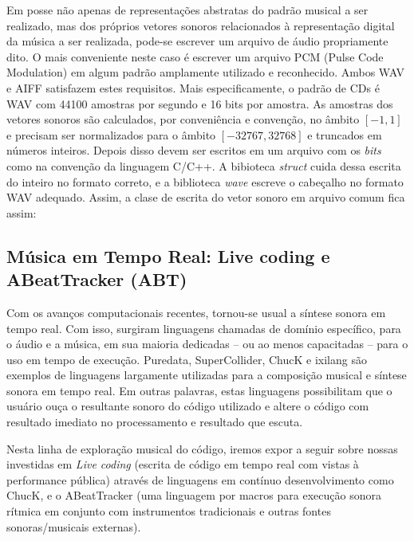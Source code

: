 
Em posse não apenas de representações abstratas do padrão musical a ser realizado, mas dos próprios vetores sonoros relacionados à representação digital da música a ser realizada, pode-se escrever um arquivo de áudio propriamente dito. O mais conveniente neste caso é escrever um arquivo PCM (Pulse Code Modulation) em algum padrão amplamente utilizado e reconhecido. Ambos WAV e AIFF satisfazem estes requisitos. Mais especificamente, o padrão de CDs é WAV com 44100 amostras por segundo e 16 bits por amostra. As amostras dos vetores sonoros são calculados, por conveniência e convenção, no âmbito $[-1,1]$ e precisam ser normalizados para o âmbito $[-32767,32768]$ e truncados em números inteiros. Depois disso devem ser escritos em um arquivo com os \emph{bits} como na convenção da linguagem C/C++. A bibioteca \emph{struct} cuida dessa escrita do inteiro no formato correto, e a biblioteca \emph{wave} escreve o cabeçalho no formato WAV adequado. Assim, a clase de escrita do vetor sonoro em arquivo comum fica assim:



\subsection{Música em Tempo Real: Live coding e ABeatTracker (ABT)}

Com os avanços computacionais recentes, tornou-se usual a síntese
sonora em tempo real. Com isso, surgiram linguagens chamadas de
domínio específico, para o áudio e a música, em sua maioria dedicadas
-- ou ao menos capacitadas -- para o uso em tempo de
execução. Puredata, SuperCollider, ChucK e ixilang são exemplos de
linguagens largamente utilizadas para a composição musical e síntese
sonora em tempo real. Em outras palavras, estas linguagens
possibilitam que o usuário ouça o resultante sonoro do código
utilizado e altere o código com resultado imediato no processamento e
resultado que escuta.

Nesta linha de exploração musical do código, iremos expor a seguir
sobre nossas investidas em \emph{Live coding} (escrita de código em
tempo real com vistas à performance pública) através de linguagens em
contínuo desenvolvimento como ChucK, e o ABeatTracker (uma linguagem
por macros para execução sonora rítmica em conjunto com instrumentos
tradicionais e outras fontes sonoras/musicais externas).

